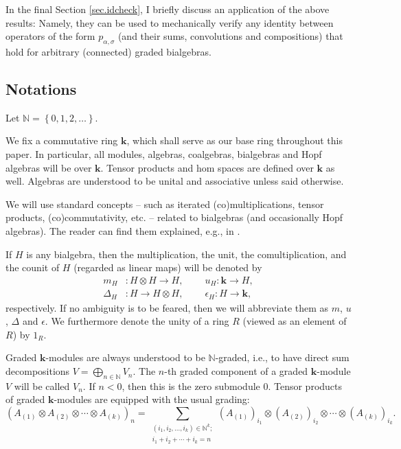 \documentclass[numbers=enddot,12pt,final,onecolumn,notitlepage]{scrartcl}%
\theoremstyle{definition}
\let\sumnonlimits\sum
\let\oplusnonlimits\bigoplus
\renewcommand{\sum}{\sumnonlimits\limits}
\renewcommand{\bigoplus}{\oplusnonlimits\limits}
\begin{document}
In the final Section \ref{sec.idcheck}, I briefly discuss an application of
the above results: Namely, they can be used to mechanically verify any
identity between operators of the form $p_{\alpha,\sigma}$ (and their sums,
convolutions and compositions) that hold for arbitrary (connected) graded bialgebras.

\subsection{Notations}

Let $\mathbb{N}=\left\{  0,1,2,\ldots\right\}  $.

We fix a commutative ring $\mathbf{k}$, which shall serve as our base ring
throughout this paper. In particular, all modules, algebras, coalgebras,
bialgebras and Hopf algebras will be over $\mathbf{k}$. Tensor products and
hom spaces are defined over $\mathbf{k}$ as well. Algebras are understood to
be unital and associative unless said otherwise.

We will use standard concepts -- such as iterated (co)multiplications, tensor
products, (co)commutativity, etc. -- related to bialgebras (and occasionally
Hopf algebras). The reader can find them explained, e.g., in \cite[Chapter
1]{GriRei}.

If $H$ is any bialgebra, then the multiplication, the unit, the
comultiplication, and the counit of $H$ (regarded as linear maps) will be
denoted by
\begin{align*}
m_{H}  &  :H\otimes H\rightarrow H,\ \ \ \ \ \ \ \ \ \ u_{H}:\mathbf{k}%
\rightarrow H,\\
\Delta_{H}  &  :H\rightarrow H\otimes H,\ \ \ \ \ \ \ \ \ \ \epsilon
_{H}:H\rightarrow\mathbf{k},
\end{align*}
respectively. If no ambiguity is to be feared, then we will abbreviate them as
$m$, $u$, $\Delta$ and $\epsilon$. We furthermore denote the unity of a ring
$R$ (viewed as an element of $R$) by $1_{R}$.

Graded $\mathbf{k}$-modules are always understood to be $\mathbb{N}$-graded,
i.e., to have direct sum decompositions $V=\bigoplus_{n\in\mathbb{N}}V_{n}$.
The $n$-th graded component of a graded $\mathbf{k}$-module $V$ will be called
$V_{n}$. If $n<0$, then this is the zero submodule $0$. Tensor products of
graded $\mathbf{k}$-modules are equipped with the usual grading:
\[
\left(  A_{\left(  1\right)  }\otimes A_{\left(  2\right)  }\otimes
\cdots\otimes A_{\left(  k\right)  }\right)  _{n}=\sum_{\substack{\left(
i_{1},i_{2},\ldots,i_{k}\right)  \in\mathbb{N}^{k};\\i_{1}+i_{2}+\cdots
+i_{k}=n}}\left(  A_{\left(  1\right)  }\right)  _{i_{1}}\otimes\left(
A_{\left(  2\right)  }\right)  _{i_{2}}\otimes\cdots\otimes\left(  A_{\left(
k\right)  }\right)  _{i_{k}}.
\]
\end{document}

